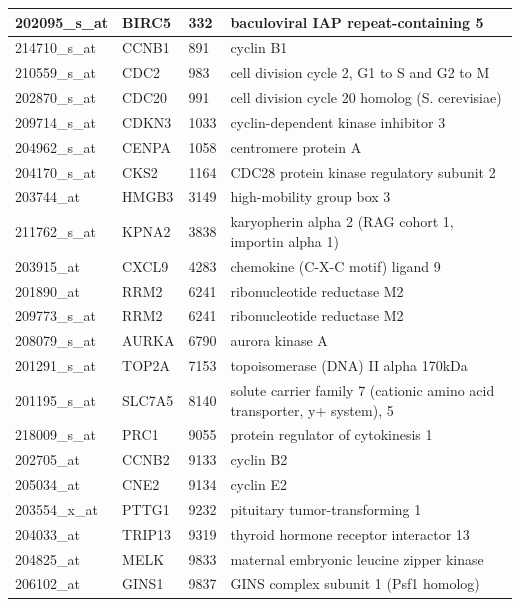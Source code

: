 \documentclass[a4paper,10pt]{article}
\begin{document}
\begin{table}
\begin{tabular}{| l | l | l | l | }
    \hline
202095\_s\_at & BIRC5 & 332 & baculoviral IAP repeat-containing 5\\ \hline 
214710\_s\_at & CCNB1 & 891 & cyclin B1\\ \hline 
210559\_s\_at & CDC2 & 983 & cell division cycle 2, G1 to S and G2 to M\\ \hline 
202870\_s\_at & CDC20 & 991 & cell division cycle 20 homolog (S. cerevisiae)\\ \hline 
209714\_s\_at & CDKN3 & 1033 & cyclin-dependent kinase inhibitor 3\\ \hline 
204962\_s\_at & CENPA & 1058 & centromere protein A\\ \hline 
204170\_s\_at & CKS2 & 1164 & CDC28 protein kinase regulatory subunit 2\\ \hline 
203744\_at & HMGB3 & 3149 & high-mobility group box 3\\ \hline 
211762\_s\_at & KPNA2 & 3838 & karyopherin alpha 2 (RAG cohort 1, importin alpha 1)\\ \hline 
203915\_at & CXCL9 & 4283 & chemokine (C-X-C motif) ligand 9\\ \hline 
201890\_at & RRM2 & 6241 & ribonucleotide reductase M2\\ \hline 
209773\_s\_at & RRM2 & 6241 & ribonucleotide reductase M2\\ \hline 
208079\_s\_at & AURKA & 6790 & aurora kinase A\\ \hline 
201291\_s\_at & TOP2A & 7153 & topoisomerase (DNA) II alpha 170kDa\\ \hline 
201195\_s\_at & SLC7A5 & 8140 & solute carrier family 7 (cationic amino acid transporter, y+ system), 5\\ \hline 
218009\_s\_at & PRC1 & 9055 & protein regulator of cytokinesis 1\\ \hline 
202705\_at & CCNB2 & 9133 & cyclin B2\\ \hline 
205034\_at & CNE2 & 9134 & cyclin E2\\ \hline 
203554\_x\_at & PTTG1 & 9232 & pituitary tumor-transforming 1\\ \hline 
204033\_at & TRIP13 & 9319 & thyroid hormone receptor interactor 13\\ \hline 
204825\_at & MELK & 9833 & maternal embryonic leucine zipper kinase\\ \hline 
206102\_at & GINS1 & 9837 & GINS complex subunit 1 (Psf1 homolog)\\ \hline 

\end{tabular}
\end{table}
\end{document}
